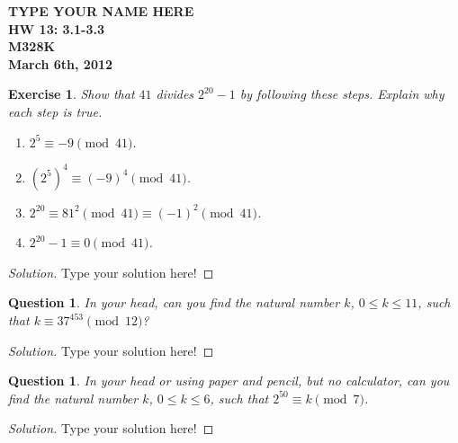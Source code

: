 \documentclass[12pt,leqno]{article}
\numberwithin{equation}{section}
\newtheorem{exer}[thm]{Exercise}
\newtheorem{ques}[thm]{Question}
\theoremstyle{definition}
\begin{document}
\thispagestyle{plain}
\begin{flushright}
\large{\textbf{TYPE YOUR NAME HERE \\
HW 13: 3.1-3.3\\
M328K \\
March 6th, 2012 \\}}
\end{flushright}

\markboth{}{} \setcounter{section}{0} \baselineskip=18pt

\setcounter{tocdepth}{4}



\setcounter{section}{3}

\setcounter{thm}{0}


\begin{exer}
Show that $41$ divides $2^{20}-1$ by following these steps.  Explain
why each step is true.
\begin{enumerate} \item $2^5 \equiv -9 \pmod{41}$.  \item $(2^5)^4
\equiv (-9)^4 \pmod{41}$.  \item $2^{20} \equiv 81^2 \pmod{41}
\equiv (-1)^2\pmod{41}$.  \item $2^{20} - 1 \equiv 0 \pmod{41}$.
\end{enumerate}
\end{exer}

\begin{proof}[Solution]
Type your solution here!
\end{proof}

\begin{ques}
In your head, can you find the natural number $k$, $0 \leq k \leq
11$, such that $k \equiv 37^{453} \pmod{12}$?
\end{ques}

\begin{proof}[Solution]
Type your solution here!
\end{proof}

\begin{ques}
In your head or using paper and pencil, but no calculator, can you
find the natural number $k$, $0 \leq k \leq 6$, such that $2^{50}
\equiv k \pmod{7}$.
\end{ques}

\begin{proof}[Solution]
Type your solution here!
\end{proof}
\end{document}
